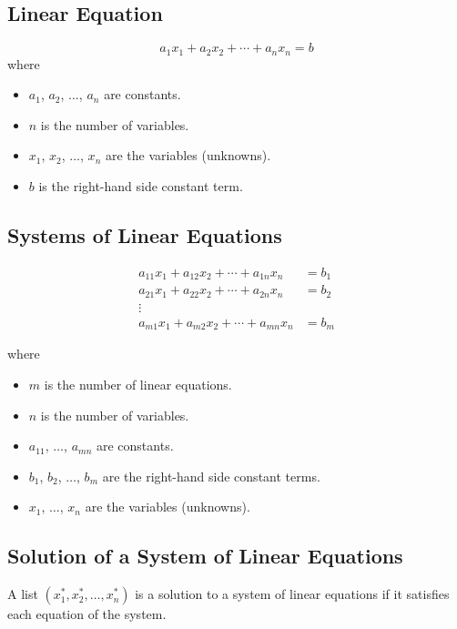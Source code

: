 \documentclass[12pt,a4paper]{article}
\newcommand{\spaceP}{\vspace*{0.5cm}}
\begin{document}
\subsection{Linear Equation}
$$
a_1 x_1 + a_2 x_2 + \cdots + a_n x_n = b
$$
where
	\begin{itemize}
	\item $a_1$, $a_2$, $\ldots$, $a_n$ are constants.
	\item $n$ is the number of variables.
	\item $x_1$, $x_2$, $\ldots$, $x_n$ are the variables (unknowns).
	\item $b$ is the right-hand side constant term.
	\end{itemize}
	
\spaceP
	
\subsection{Systems of Linear Equations}

\begin{align*}
	a_{11} x_1 + a_{12} x_2 + \cdots + a_{1n} x_n & = b_1 \\
	a_{21} x_1 + a_{22} x_2 + \cdots + a_{2n} x_n & = b_2 \\
	\vdots \phantom{+ + + } & \\
	a_{m1} x_1 + a_{m2} x_2 + \cdots + a_{mn} x_n & = b_m
\end{align*}

where
	\begin{itemize}
	\item $m$ is the number of linear equations.
	\item $n$ is the number of variables.
	\item $a_{11}$, $\ldots$, $a_{mn}$ are constants.
	\item $b_1$, $b_2$, $\ldots$, $b_m$ are the right-hand side constant terms.
	\item $x_1$, $\ldots$, $x_n$ are the variables (unknowns).
	\end{itemize}
	
\spaceP
	
\subsection{Solution of a System of Linear Equations}

A list $(x_1^*, x_2^*, \ldots , x_n^*)$ is a solution to a system of linear equations if it satisfies each equation of the system.
\end{document}
